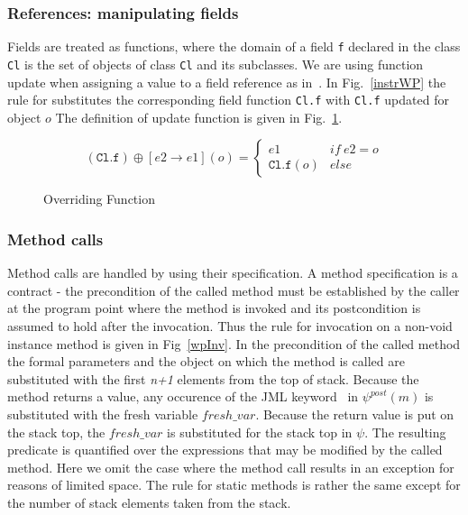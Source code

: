 \subsubsection{References: manipulating fields}
Fields are treated as functions, where the domain of a field \texttt{f} 
declared in the class \texttt{Cl} is the set of objects of class \texttt{Cl} and its subclasses.
We are using function update when assigning a value to a field reference as in~\cite{B00ppp}. 
In Fig.~\ref{instrWP} the rule for  substitutes the corresponding field function \texttt{Cl.f} with \texttt{Cl.f} updated for object $o$ 
The definition of update function is given in Fig.~\ref{override}.

\begin{figure}
$$
 (\texttt{Cl.f})\oplus[e2 \rightarrow e1](o) = \left\{ \begin{array} {ll}
						       e1 & if \ e2 = o \\
					               \texttt{Cl.f}(o)	& else 
	\end{array}\right. 
$$ 
\caption{Overriding Function}
\label{override}
\end{figure}



\subsubsection{Method calls}
Method calls are handled by using their specification. A method specification is a contract - the precondition of the called method
must be established by the caller at the program point where the method is invoked and its postcondition is assumed to hold after the invocation. Thus the rule for
invocation on a non-void instance method is given in Fig~\ref{wpInv}. In the precondition of the called method the formal parameters and the object on which the method is called are substituted with the first \textit{n+1} elements from the top of stack. 
Because the method returns a value, any occurence of the JML keyword \result \ in $\psi^{post}(m)$ is substituted with the fresh variable $fresh\_var$.  
Because the return value is put on the stack top, the $fresh\_var$ is substituted for the stack top in $\psi$. The resulting predicate is quantified over the 
expressions that may be modified by the called method. Here we omit the case where the method call results in an exception for reasons of limited space. 
The rule for static methods is rather the same except for the number of stack elements taken from the stack.  

